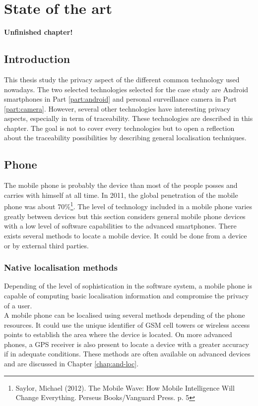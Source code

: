 \chapter{State of the art}
\label{chap:general}

\textbf{Unfinished chapter!}

\section*{Introduction}
\label{sec:soa-intro}

This thesis study the privacy aspect of the different common technology used nowadays.
The two selected technologies selected for the case study are Android smartphones in Part \ref{part:android} and personal surveillance camera in Part \ref{part:camera}.
However, several other technologies have interesting privacy aspects, especially in term of traceability.
These technologies are described in this chapter.
The goal is not to cover every technologies but to open a reflection about the traceability possibilities by describing general localisation techniques.

\section{Phone}

The mobile phone is probably the device than most of the people posses and carries with himself at all time.
In 2011, the global penetration of the mobile phone was about 70\%\footnote{Saylor, Michael (2012). The Mobile Wave: How Mobile Intelligence Will Change Everything. Perseus Books/Vanguard Press. p. 5}.
The level of technology included in a mobile phone varies greatly between devices but this section considers general mobile phone devices with a low level of software capabilities to the advanced smartphones.
There exists several methods to locate a mobile device.
It could be done from a device or by external third parties.

\subsection{Native localisation methods}

Depending of the level of sophistication in the software system, a mobile phone is capable of computing basic localisation information and compromise the privacy of a user.\\

A mobile phone can be localised using several methods depending of the phone resources.
It could use the unique identifier of GSM cell towers or wireless access points to establish the area where the device is located.
On more advanced phones, a GPS receiver is also present to locate a device with a greater accuracy if in adequate conditions.
These methods are often available on advanced devices and are discussed in Chapter \ref{chap:and-loc}.

